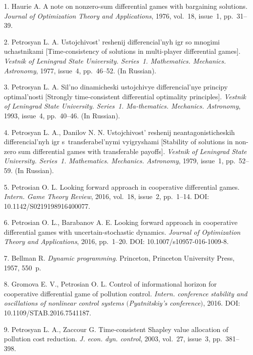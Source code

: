 

{\footnotesize

\vskip 5mm


\vskip 3mm



1. Haurie A. A note on nonzero-sum differential games with
bargaining solutions. \emph{Journal of Optimization Theory and
Applications}, 1976, vol.~18, issue~1, pp.~31--39.

2. Petrosyan L. A. Ustojchivost' reshenij differencial'nyh igr so
mnogimi uchastnikami [Time-consistency of solutions in
multi-player differential games]. \emph{Vestnik of Leningrad State
University. Series~1. Mathematics. Mechanics. Astronomy}, 1977,
issue~4, pp.~46--52. (In Russian).

3. Petrosyan L. A. Sil'no dinamicheski ustojchivye
differencial'nye principy optimal'nosti [Strongly time-consistent
differential optimality principles]. \emph{Vestnik of Leningrad
State University. Series~1. Ma-\linebreak thematics. Mechanics.
Astronomy}, 1993, issue~4, pp.~40--46. (In Russian).

4. Petrosyan L. A., Danilov N. N. Ustojchivost' reshenij
neantagonisticheskih differencial'nyh igr s~transferabel'nymi
vyigryshami [Stability of solutions in non-zero sum differential
games with transferable payoffs]. \emph{Vestnik of Leningrad State
University. Series~1. Mathematics. Mechanics. Astronomy}, 1979,
issue~1, pp.~52--59. (In Russian).

5. Petrosian O. L. Looking forward approach in cooperative
differential games. \emph{Intern. Game Theory Review}, 2016,
vol.~18, issue~2, pp.~1--14. DOI: 10.1142/S0219198916400077.

6. Petrosian O. L., Barabanov A. E. Looking forward approach in
cooperative differential games with uncertain-stochastic dynamics.
\emph{Journal of Optimization Theory and Applications}, 2016,
pp.~1--20. DOI: 10.1007/s10957-016-1009-8.

7. Bellman R. \emph{Dynamic programming}. Princeton, Princeton
University Press, 1957, 550~p.

8. Gromova E. V., Petrosian O. L. Control of informational horizon
for cooperative differential game of pollution control.
\emph{Intern. conference stability and oscillations of nonlinear
control systems $($Pyatnitskiy's conference$)$}, 2016. DOI:
10.1109/STAB.2016.7541187.

9. Petrosyan L. A., Zaccour G. Time-consistent Shapley value
allocation of pollution cost reduction. \emph{J. econ. dyn.
control}, 2003, vol.~27, issue~3, pp.~381--398.

}
